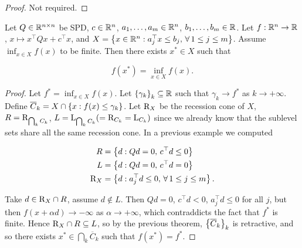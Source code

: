 \begin{proof}
    Not required.
\end{proof}

\begin{proposition}

    Let $Q \in \mathbb{R}^{n \times n}$ be SPD, $c \in {\mathbb{R}^n}$, $a_1,\dots, a_m \in {\mathbb{R}^n}$, $b_1,\dots,b_m \in \mathbb{R}$. Let $f : {\mathbb{R}^n} \to \mathbb{R}$, $x \mapsto x^\top Q x + c^\top x$, and $X = \left\{ x \in {\mathbb{R}^n} : a_j^\top x \le b_j,\, \forall \, 1 \le j \le m \right\}$. Assume $\inf_{x \in X} f(x)$ to be finite. Then there exists $x^* \in X$ such that 

    \[ f(x^*) = \inf_{x \in X} f(x). \]
    
\end{proposition}

\begin{proof}
    
    Let $f^* = \inf_{x \in X} f(x)$. Let $\left\{ \gamma_k \right\}_k \subseteq \mathbb{R}$ such that $\gamma_k \to f^*$ as $k \to +\infty$. Define $\overline{C}_k = X \cap \left\{ x : f(x) \le \gamma_k \right\}$. Let $\mathrm{R}_{X}$ be the recession cone of $X$, $R = \mathrm{R}_{\bigcap_k C_k}$, $L = \mathrm{L}_{\bigcap_k C_k} (= \mathrm{R}_{C_k} = \mathrm{L}_{C_k})$ since we already know that the sublevel sets share all the same recession cone. In a previous example we computed 

    \begin{align*}
        R &= \left\{ d : Qd = 0,\, c^\top d \le 0 \right\} \\
        L &= \left\{ d : Qd = 0,\, c^\top d = 0 \right\} \\
        \mathrm{R}_{X}  &= \left\{ d : a_j^\top d \le 0,\, \forall\, 1\le j\le m \right\}.
    \end{align*}

    Take $d \in \mathrm{R}_{X} \cap R$, assume $d \notin L$. Then $Qd = 0$, $c^\top d < 0$, $a_j^\top d \le 0$ for all $j$, but then $f(x + \alpha d) \to -\infty$ as $\alpha \to +\infty$, which contraddicts the fact that $f^*$ is finite. Hence $\mathrm{R}_{X} \cap R \subseteq L$, so by the previous theorem, $\left\{ \overline{C}_k \right\}_k$ is retractive, and so there exists $x^* \in \bigcap_k \overline{C}_k$ such that $f(x^*) = f^*$.

\end{proof}

